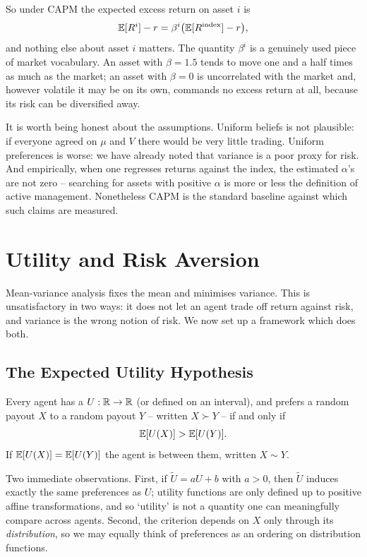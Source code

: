 \documentclass[a4paper]{scrartcl}
\begin{document}
So under CAPM the expected excess return on asset $i$ is
$$
\mathbb{E}[R^i] - r = \beta^i\big(\mathbb{E}[R^{\mathrm{index}}] - r\big),
$$
and nothing else about asset $i$ matters. The quantity $\beta^i$ is a genuinely used piece of market vocabulary. An asset with $\beta = 1.5$ tends to move one and a half times as much as the market; an asset with $\beta = 0$ is uncorrelated with the market and, however volatile it may be on its own, commands no excess return at all, because its risk can be diversified away.

\begin{remark}
	It is worth being honest about the assumptions. Uniform beliefs is not plausible: if everyone agreed on $\mu$ and $V$ there would be very little trading. Uniform preferences is worse: we have already noted that variance is a poor proxy for risk. And empirically, when one regresses returns against the index, the estimated $\alpha$'s are not zero -- searching for assets with positive $\alpha$ is more or less the definition of active management. Nonetheless CAPM is the standard baseline against which such claims are measured.
\end{remark}

\section{Utility and Risk Aversion}

Mean-variance analysis fixes the mean and minimises variance. This is unsatisfactory in two ways: it does not let an agent trade off return against risk, and variance is the wrong notion of risk. We now set up a framework which does both.

\subsection{The Expected Utility Hypothesis}

\begin{definition}
	Every agent has a  $U : \mathbb{R} \to \mathbb{R}$ (or defined on an interval), and prefers a random payout $X$ to a random payout $Y$ -- written $X \succ Y$ -- if and only if
	$$
	\mathbb{E}[U(X)] > \mathbb{E}[U(Y)].
	$$
	If $\mathbb{E}[U(X)] = \mathbb{E}[U(Y)]$ the agent is  between them, written $X \sim Y$.
\end{definition}

Two immediate observations. First, if $\tilde U = aU + b$ with $a > 0$, then $\tilde U$ induces exactly the same preferences as $U$; utility functions are only defined up to positive affine transformations, and so `utility' is not a quantity one can meaningfully compare across agents. Second, the criterion depends on $X$ only through its \emph{distribution}, so we may equally think of preferences as an ordering on distribution functions.
\end{document}
